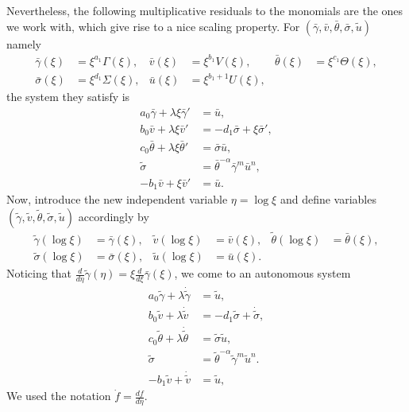 \documentclass[a4paper,11pt]{article}
\def\bg{{\bar{\gamma}}}
\def\bv{{\bar{v}}}
\def\bth{{\bar{\theta}}}
\def\bs{{\bar{\sigma}}}
\def\bu{{\bar{u}}}
\def\tg{{\tilde{\gamma}}}
\def\tv{{\tilde{v}}}
\def\tth{{\tilde{\theta}}}
\def\ts{{\tilde{\sigma}}}
\def\tu{{\tilde{u}}}
\def\dtg{{\dot{\tilde{\gamma}}}}
\def\dtv{{\dot{\tilde{v}}}}
\def\dtth{{\dot{\tilde{\theta}}}}
\def\dts{{\dot{\tilde{\sigma}}}}
\theoremstyle{remark}
\begin{document}
Nevertheless, the following multiplicative residuals to the monomials are the ones we work with, which give rise to a nice scaling property. For $(\bg,\bv,\bth,\bs,\tu)$ namely
\begin{equation} \label{eq:CAPtoBAR}
\begin{aligned}
 \bg(\xi)&=\xi^{a_1}\Gamma(\xi), &
 \bv(\xi)&=\xi^{b_1}V(\xi), &
 \bth(\xi)&=\xi^{c_1}\Theta(\xi), \\
 \bs(\xi)&=\xi^{d_1}\Sigma(\xi), &
 \bu(\xi)&=\xi^{b_1+1}U(\xi),
\end{aligned}
\end{equation}
the system they satisfy is
\begin{equation} \label{eq:barsys}
 \begin{aligned}
  a_0\bg + \lambda\xi\bg' &=\bu,\\
  b_0\bv + \lambda\xi\bv' &=-d_1 \bs + \xi\bs',\\
  c_0\bth+ \lambda\xi\bth'&=\bs\bu,\\
  \ts &=\bth^{-\alpha}\bg^m\bu^n,\\
  -b_1\bv+\xi\bv' &= \bu.
 \end{aligned}
\end{equation}
Now, introduce the new independent variable $\eta = \log\xi$ and define variables $(\tg,\tv,\tth,\ts,\tu)$ accordingly by
\begin{equation} \label{eq:BARtoTIL}
\begin{aligned}
 \tg(\log\xi)&=\bg(\xi), &
 \tv(\log\xi)&=\bv(\xi), &
 \tth(\log\xi)&=\bth(\xi), \\
 \ts(\log\xi)&=\bs(\xi), &
 \tu(\log\xi)&=\bu(\xi).
\end{aligned}
\end{equation}
Noticing that $\frac{d}{d\eta}\tg(\eta) = \xi \frac{d}{d\xi}\bg(\xi)$, we come to an autonomous system
\begin{equation} \label{eq:tildesys}
 \begin{aligned}
  a_0\tg + \lambda\dtg &=\tu,\\
  b_0\tv + \lambda\dtv &=-d_1 \ts + \dts,\\
  c_0\tth+ \lambda\dtth&=\ts\tu,\\
  \ts &=\tth^{-\alpha}\tg^m\tu^n.\\
  -b_1\tv+\dtv &= \tu,
 \end{aligned}
\end{equation}
We used the notation $\dot{f}=\frac{df}{d\eta}$.
\end{document}
